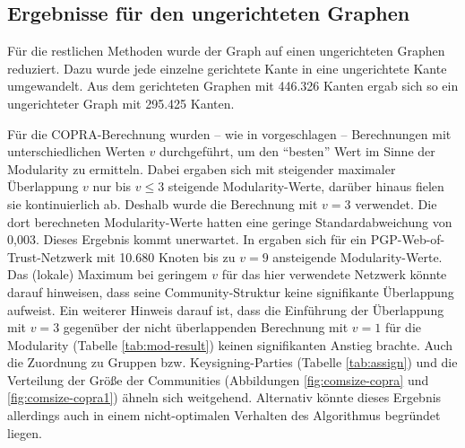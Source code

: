 \subsection{Ergebnisse für den ungerichteten Graphen}
\label{sec:ergebnisse-fur-den-1}

Für die restlichen Methoden wurde der Graph auf einen ungerichteten
Graphen reduziert. Dazu wurde jede einzelne gerichtete Kante in eine
ungerichtete Kante umgewandelt. Aus dem gerichteten Graphen mit 446.326
Kanten ergab sich so ein ungerichteter Graph mit 295.425 Kanten.

Für die COPRA-Berechnung wurden -- wie in \cite{Gregory2010}
vorgeschlagen -- Berechnungen mit unterschiedlichen Werten $v$
durchgeführt, um den "`besten"' Wert im Sinne der Modularity zu
ermitteln. Dabei ergaben sich mit steigender maximaler Überlappung
$v$ nur bis $v\le 3$ steigende Modularity-Werte, darüber hinaus
fielen sie kontinuierlich ab. Deshalb wurde die Berechnung mit $v=3$
verwendet. Die dort berechneten Modularity-Werte hatten eine geringe
Standardabweichung von 0,003. Dieses Ergebnis kommt unerwartet. In
\cite{Gregory2010} ergaben sich für ein PGP-Web-of-Trust-Netzwerk
mit 10.680 Knoten bis zu $v=9$ ansteigende Modularity-Werte. Das
(lokale) Maximum bei geringem $v$ für das hier verwendete Netzwerk
könnte darauf hinweisen, dass seine Community-Struktur keine
signifikante Überlappung aufweist. Ein weiterer Hinweis darauf ist,
dass die Einführung der Überlappung mit $v=3$ gegenüber der
nicht überlappenden Berechnung mit $v=1$ für die Modularity
(Tabelle \ref{tab:mod-result}) keinen signifikanten Anstieg
brachte. Auch die Zuordnung zu Gruppen bzw. Keysigning-Parties
(Tabelle \ref{tab:assign}) und die Verteilung der Größe der
Communities (Abbildungen \ref{fig:comsize-copra} und
\ref{fig:comsize-copra1}) ähneln sich weitgehend. Alternativ
könnte dieses Ergebnis allerdings auch in einem nicht-optimalen
Verhalten des Algorithmus begründet liegen.

